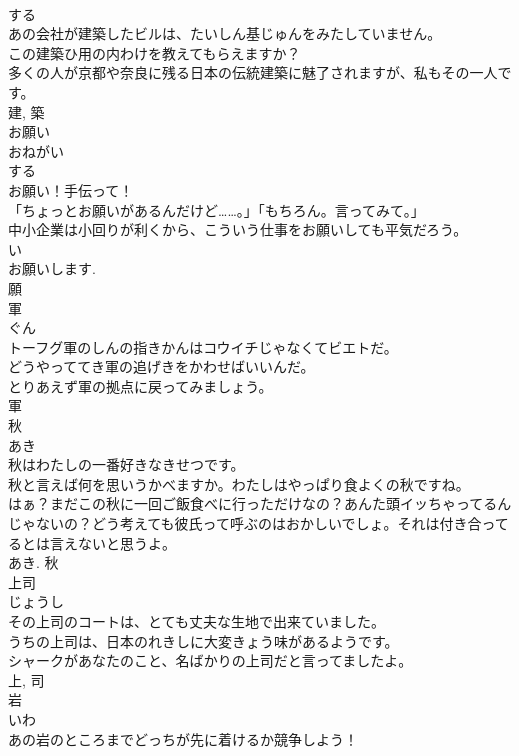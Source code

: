 \documentclass[8pt]{extreport}
\begin{document}
\begin{CJK}{UTF8}{min}
\\	する 
\\	あの会社が建築したビルは、たいしん基じゅんをみたしていません。	
\\	この建築ひ用の内わけを教えてもらえますか？	
\\	多くの人が京都や奈良に残る日本の伝統建築に魅了されますが、私もその一人です。	
\\	建, 築	
\\	お願い	
\\	おねがい	
\\	する 
\\	お願い！手伝って！	
\\	「ちょっとお願いがあるんだけど……。」「もちろん。言ってみて。」	
\\	中小企業は小回りが利くから、こういう仕事をお願いしても平気だろう。	
\\	い 
\\	お願いします. 
\\	願	
\\	軍	
\\	ぐん	
\\	トーフグ軍のしんの指きかんはコウイチじゃなくてビエトだ。	
\\	どうやっててき軍の追げきをかわせばいいんだ。	
\\	とりあえず軍の拠点に戻ってみましょう。	
\\	軍	
\\	秋	
\\	あき	
\\	秋はわたしの一番好きなきせつです。	
\\	秋と言えば何を思いうかべますか。わたしはやっぱり食よくの秋ですね。	
\\	はぁ？まだこの秋に一回ご飯食べに行っただけなの？あんた頭イッちゃってるんじゃないの？どう考えても彼氏って呼ぶのはおかしいでしょ。それは付き合ってるとは言えないと思うよ。	
\\	あき.	秋	
\\	上司	
\\	じょうし	
\\	その上司のコートは、とても丈夫な生地で出来ていました。	
\\	うちの上司は、日本のれきしに大変きょう味があるようです。	
\\	シャークがあなたのこと、名ばかりの上司だと言ってましたよ。	
\\	上, 司	
\\	岩	
\\	いわ	
\\	あの岩のところまでどっちが先に着けるか競争しよう！	

\end{CJK}
\end{document}
